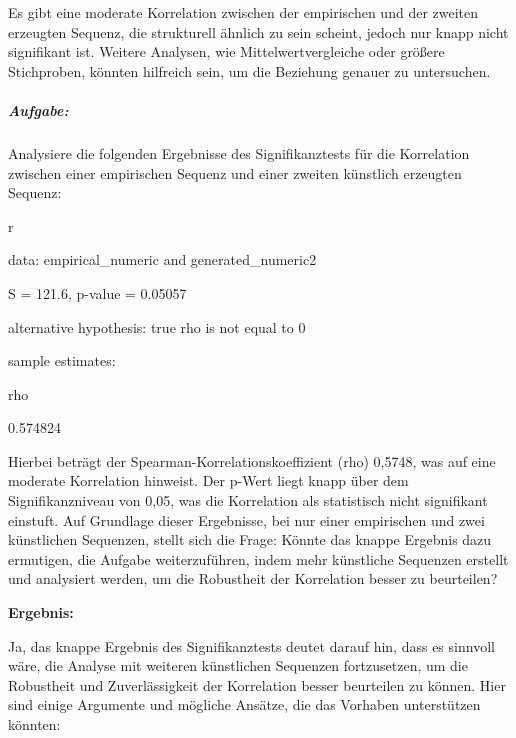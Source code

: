 \documentclass[
]{article}
\begin{document}
Es gibt eine moderate Korrelation zwischen der empirischen und der
zweiten erzeugten Sequenz, die strukturell ähnlich zu sein scheint,
jedoch nur knapp nicht signifikant ist. Weitere Analysen, wie
Mittelwertvergleiche oder größere Stichproben, könnten hilfreich sein,
um die Beziehung genauer zu untersuchen.

\subparagraph{\texorpdfstring{
\textbf{Aufgabe:}}{ Aufgabe:}}\label{aufgabe-6}

Analysiere die folgenden Ergebnisse des Signifikanztests für die
Korrelation zwischen einer empirischen Sequenz und einer zweiten
künstlich erzeugten Sequenz:

r

data: empirical\_numeric and generated\_numeric2

S = 121.6, p-value = 0.05057

alternative hypothesis: true rho is not equal to 0

sample estimates:

rho

0.574824

Hierbei beträgt der Spearman-Korrelationskoeffizient (rho) 0,5748, was
auf eine moderate Korrelation hinweist. Der p-Wert liegt knapp über dem
Signifikanzniveau von 0,05, was die Korrelation als statistisch nicht
signifikant einstuft. Auf Grundlage dieser Ergebnisse, bei nur einer
empirischen und zwei künstlichen Sequenzen, stellt sich die Frage:
Könnte das knappe Ergebnis dazu ermutigen, die Aufgabe weiterzuführen,
indem mehr künstliche Sequenzen erstellt und analysiert werden, um die
Robustheit der Korrelation besser zu beurteilen?

\textbf{Ergebnis:}

Ja, das knappe Ergebnis des Signifikanztests deutet darauf hin, dass es
sinnvoll wäre, die Analyse mit weiteren künstlichen Sequenzen
fortzusetzen, um die Robustheit und Zuverlässigkeit der Korrelation
besser beurteilen zu können. Hier sind einige Argumente und mögliche
Ansätze, die das Vorhaben unterstützen könnten:
\end{document}
